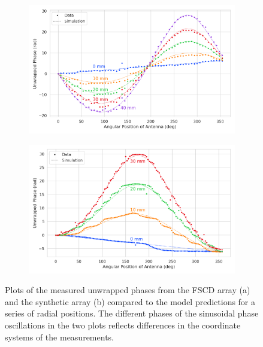 \begin{figure}[htbp]
    \centering
    \begin{subfigure}{.7\textwidth}
      \centering
      \includegraphics[width=1\textwidth]{figs/Chapter-5/230411_jugaad_measured_phases_z0.png}
      \caption{}
      \label{fig:jugaad_phase}
    \end{subfigure}
    \par\medskip %
    \begin{subfigure}{.7\textwidth}
      \centering
      \includegraphics[width=1\textwidth]{figs/Chapter-5/230411_synthetic_array_measured_phases_z0.png}
      \caption{}
      \label{fig:synth_jugaad_phase}
    \end{subfigure}
    \caption{Plots of the measured unwrapped phases from the FSCD array (a) and the synthetic array (b) compared to the model predictions for a series of radial positions. The different phases of the sinusoidal phase oscillations in the two plots reflects differences in the coordinate systems of the measurements.}
    \label{fig:jugaad_measured_phases}
    \end{figure}
    

